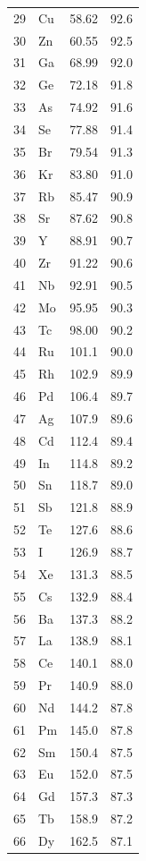 \documentclass[11pt,a4paper]{article}
\begin{document}
\begin{longtable}{c l c c}
		29 & Cu  & 58.62  & 92.6 \\
		30 & Zn  & 60.55  & 92.5 \\
		31 & Ga  & 68.99  & 92.0 \\
		32 & Ge  & 72.18  & 91.8 \\
		33 & As  & 74.92  & 91.6 \\
		34 & Se  & 77.88  & 91.4 \\
		35 & Br  & 79.54  & 91.3 \\
		36 & Kr  & 83.80  & 91.0 \\
		37 & Rb  & 85.47  & 90.9 \\
		38 & Sr  & 87.62  & 90.8 \\
		39 & Y   & 88.91  & 90.7 \\
		40 & Zr  & 91.22  & 90.6 \\
		41 & Nb  & 92.91  & 90.5 \\
		42 & Mo  & 95.95  & 90.3 \\
		43 & Tc  & 98.00  & 90.2 \\
		44 & Ru  & 101.1  & 90.0 \\
		45 & Rh  & 102.9  & 89.9 \\
		46 & Pd  & 106.4  & 89.7 \\
		47 & Ag  & 107.9  & 89.6 \\
		48 & Cd  & 112.4  & 89.4 \\
		49 & In  & 114.8  & 89.2 \\
		50 & Sn  & 118.7  & 89.0 \\
		51 & Sb  & 121.8  & 88.9 \\
		52 & Te  & 127.6  & 88.6 \\
		53 & I   & 126.9  & 88.7 \\
		54 & Xe  & 131.3  & 88.5 \\
		55 & Cs  & 132.9  & 88.4 \\
		56 & Ba  & 137.3  & 88.2 \\
		57 & La  & 138.9  & 88.1 \\
		58 & Ce  & 140.1  & 88.0 \\
		59 & Pr  & 140.9  & 88.0 \\
		60 & Nd  & 144.2  & 87.8 \\
		61 & Pm  & 145.0  & 87.8 \\
		62 & Sm  & 150.4  & 87.5 \\
		63 & Eu  & 152.0  & 87.5 \\
		64 & Gd  & 157.3  & 87.3 \\
		65 & Tb  & 158.9  & 87.2 \\
		66 & Dy  & 162.5  & 87.1 \\

\end{longtable}
\end{document}
